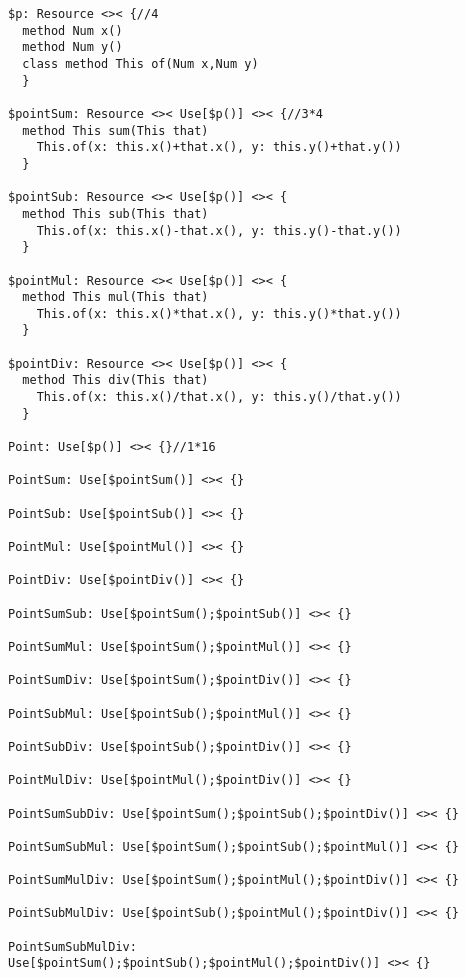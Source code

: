 \begin{lstlisting}[basicstyle=\tiny, mathescape=false]
$p: Resource <>< {//4
  method Num x()
  method Num y()
  class method This of(Num x,Num y)
  }

$pointSum: Resource <>< Use[$p()] <>< {//3*4
  method This sum(This that)
    This.of(x: this.x()+that.x(), y: this.y()+that.y())
  }

$pointSub: Resource <>< Use[$p()] <>< {
  method This sub(This that)
    This.of(x: this.x()-that.x(), y: this.y()-that.y())
  }

$pointMul: Resource <>< Use[$p()] <>< {
  method This mul(This that)
    This.of(x: this.x()*that.x(), y: this.y()*that.y())
  }

$pointDiv: Resource <>< Use[$p()] <>< {
  method This div(This that)
    This.of(x: this.x()/that.x(), y: this.y()/that.y())
  }

Point: Use[$p()] <>< {}//1*16

PointSum: Use[$pointSum()] <>< {}

PointSub: Use[$pointSub()] <>< {}

PointMul: Use[$pointMul()] <>< {}

PointDiv: Use[$pointDiv()] <>< {}

PointSumSub: Use[$pointSum();$pointSub()] <>< {}

PointSumMul: Use[$pointSum();$pointMul()] <>< {}

PointSumDiv: Use[$pointSum();$pointDiv()] <>< {}

PointSubMul: Use[$pointSub();$pointMul()] <>< {}

PointSubDiv: Use[$pointSub();$pointDiv()] <>< {}

PointMulDiv: Use[$pointMul();$pointDiv()] <>< {}

PointSumSubDiv: Use[$pointSum();$pointSub();$pointDiv()] <>< {}

PointSumSubMul: Use[$pointSum();$pointSub();$pointMul()] <>< {}

PointSumMulDiv: Use[$pointSum();$pointMul();$pointDiv()] <>< {}

PointSubMulDiv: Use[$pointSub();$pointMul();$pointDiv()] <>< {}

PointSumSubMulDiv: Use[$pointSum();$pointSub();$pointMul();$pointDiv()] <>< {}
\end{lstlisting}


